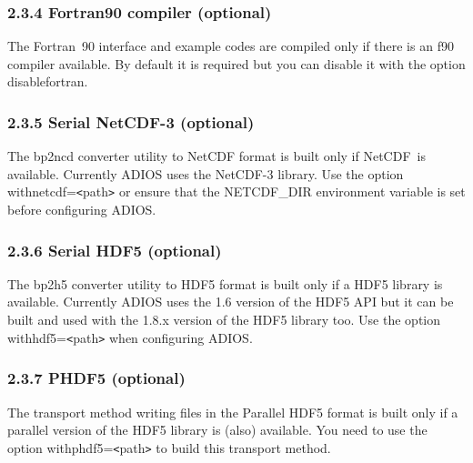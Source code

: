 \vspace{10pt}
\subsubsection*{{\large \textbf{2.3.4 Fortran90 compiler (optional)}}}

\vspace{10pt}
The Fortran~90 interface and example codes are compiled only if there is an f90 
compiler available. By default it is required but you can disable it with the option 
\-{}\-{}disable\-{}fortran.\label{HToc182553339}

\vspace{10pt}
\subsubsection*{{\large \textbf{2.3.5 Serial NetCDF-3 (optional)}}}

\vspace{10pt}
The bp2ncd converter utility to NetCDF format is built only if NetCDF~is available. 
 Currently ADIOS uses the NetCDF-3 library. Use the option \-{}\-{}with\-{}netcdf=\texttt{<}path\texttt{>} 
or ensure that the NETCDF\_DIR environment variable is set before configuring ADIOS.\label{HToc182553340}

\vspace{10pt}
\subsubsection*{{\large \textbf{2.3.6 Serial HDF5 (optional)}}}

\vspace{10pt}
The bp2h5 converter utility to HDF5 format is built only if a HDF5 library is available. 
Currently ADIOS uses the 1.6 version of the HDF5 API but it can be built and used 
with the 1.8.x version of the HDF5 library too. Use the option \-{}\-{}with\-{}hdf5=\texttt{<}path\texttt{>} 
when configuring ADIOS.\label{HToc84890227}\label{HToc212016602}\label{HToc212016844}\label{HToc182553341}

\vspace{10pt}
\subsubsection*{{\large \textbf{2.3.7 PHDF5 (optional)}}}

\vspace{10pt}
The transport method writing files in the Parallel HDF5 format is built only if 
a parallel version of the HDF5 library is (also) available. You need to use the 
option \-{}\-{}with\-{}phdf5=\texttt{<}path\texttt{>} to build this transport method. 

